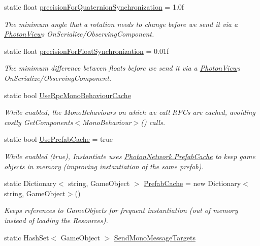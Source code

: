 \begin{DoxyCompactItemize}
static float \hyperlink{class_photon_network_a65cc14cdfda9c9cb8dad3b3f862097d4}{precision\+For\+Quaternion\+Synchronization} = 1.\+0f
\begin{DoxyCompactList}\small\item\em The minimum angle that a rotation needs to change before we send it via a \hyperlink{class_photon_view}{Photon\+View}\textquotesingle{}s On\+Serialize/\+Observing\+Component. \end{DoxyCompactList}\item 
static float \hyperlink{class_photon_network_a734d436869fa53cb8660de63e79e6252}{precision\+For\+Float\+Synchronization} = 0.\+01f
\begin{DoxyCompactList}\small\item\em The minimum difference between floats before we send it via a \hyperlink{class_photon_view}{Photon\+View}\textquotesingle{}s On\+Serialize/\+Observing\+Component. \end{DoxyCompactList}\item 
static bool \hyperlink{class_photon_network_a2ea887525d418e088bf99d303673d2f3}{Use\+Rpc\+Mono\+Behaviour\+Cache}
\begin{DoxyCompactList}\small\item\em While enabled, the Mono\+Behaviours on which we call R\+P\+Cs are cached, avoiding costly Get\+Components$<$\+Mono\+Behaviour$>$() calls. \end{DoxyCompactList}\item 
static bool \hyperlink{class_photon_network_a232458dc1894d99134f6d978524cbb99}{Use\+Prefab\+Cache} = true
\begin{DoxyCompactList}\small\item\em While enabled (true), Instantiate uses \hyperlink{class_photon_network_a5d231578fbaadcb89dd592d2d8ddfd0a}{Photon\+Network.\+Prefab\+Cache} to keep game objects in memory (improving instantiation of the same prefab). \end{DoxyCompactList}\item 
static Dictionary$<$ string, Game\+Object $>$ \hyperlink{class_photon_network_a5d231578fbaadcb89dd592d2d8ddfd0a}{Prefab\+Cache} = new Dictionary$<$string, Game\+Object$>$()
\begin{DoxyCompactList}\small\item\em Keeps references to Game\+Objects for frequent instantiation (out of memory instead of loading the Resources). \end{DoxyCompactList}\item 
static Hash\+Set$<$ Game\+Object $>$ \hyperlink{class_photon_network_a71b2a9299c3906b3e3d49f0ac296a87b}{Send\+Mono\+Message\+Targets}

\end{DoxyCompactItemize}
